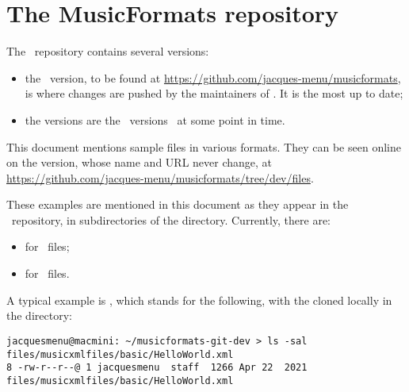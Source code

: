 
\chapter{The MusicFormats repository}

The \mf\ repository contains several versions:
\begin{itemize}
\item the  \master\ version, to be found at \url{https://github.com/jacques-menu/musicformats}, is where changes are pushed by the maintainers of \mf. It is the most up to date;
\item the  versions are the \master\ versions \frozen\ at some point in time.
\end{itemize}

This document mentions sample files in various formats. They can be seen online on the  version, whose name and URL never change, at \url{https://github.com/jacques-menu/musicformats/tree/dev/files}.

These examples are mentioned in this document as they appear in the \mf\ repository, in subdirectories of the  directory. Currently, there are:
\begin{itemize}
\item {} for \mxml\ files;
\item {} for \msdlLang\ files.
\end{itemize}

A typical example is , which stands for the following, with the  cloned locally in the  directory:
\begin{lstlisting}[language=Terminal]
jacquesmenu@macmini: ~/musicformats-git-dev > ls -sal files/musicxmlfiles/basic/HelloWorld.xml
8 -rw-r--r--@ 1 jacquesmenu  staff  1266 Apr 22  2021 files/musicxmlfiles/basic/HelloWorld.xml
\end{lstlisting}


